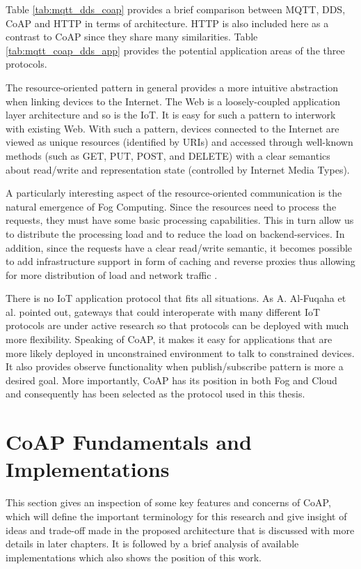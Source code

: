 Table \ref{tab:mqtt_dds_coap} provides a brief comparison between MQTT, DDS, CoAP and HTTP in terms of architecture. HTTP is also included here as a contrast to CoAP since they share many similarities. Table \ref{tab:mqtt_coap_dds_app} provides the potential application areas of the three protocols.

The resource-oriented pattern in general provides a more intuitive abstraction when linking devices to the Internet. The Web is a loosely-coupled application layer architecture \cite{6159216} and so is the IoT. It is easy for such a pattern to interwork with existing Web. With such a pattern, devices connected to the Internet are viewed as unique resources (identified by URIs) and accessed through well-known methods (such as GET, PUT, POST, and DELETE) with a clear semantics about read/write and representation state (controlled by Internet Media Types). 

A particularly interesting aspect of the resource-oriented communication is the natural emergence of Fog Computing. Since the resources need to process the requests, they must have some basic processing capabilities. This in turn allow us to distribute the processing load and to reduce the load on backend-services. In addition, since the requests have a clear read/write semantic, it becomes possible to add infrastructure support in form of caching and reverse proxies thus allowing for more distribution of load and network traffic \cite{7396558}. 

There is no IoT application protocol that fits all situations. As A. Al-Fuqaha et al. \cite{7123563} pointed out, gateways that could interoperate with many different IoT protocols are under active research so that protocols can be deployed with much more flexibility. Speaking of CoAP, it makes it easy for applications that are more likely deployed in unconstrained environment to talk to constrained devices. It also provides observe functionality when publish/subscribe pattern is more a desired goal. More importantly, CoAP has its position in both Fog and Cloud and consequently has been selected as the protocol used in this thesis.


\section{CoAP Fundamentals and Implementations} \label{CoAP_intro}

This section gives an inspection of some key features and concerns of CoAP, which will define the important terminology for this research and give insight of ideas and trade-off made in the proposed architecture that is discussed with more details in later chapters. It is followed by a brief analysis of available implementations which also shows the position of this work. 

